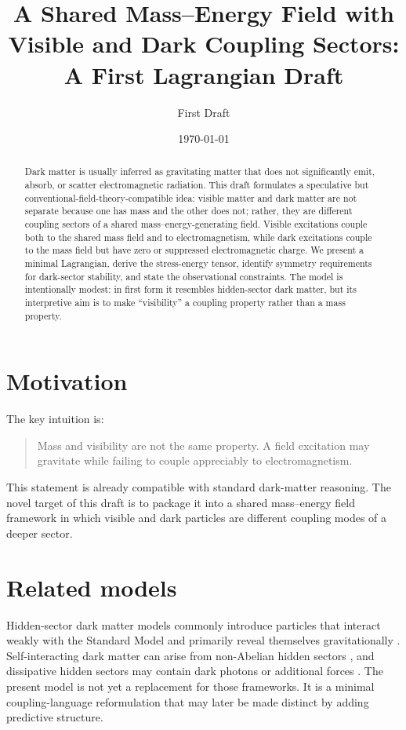 \documentclass[11pt]{article}
\title{A Shared Mass--Energy Field with Visible and Dark Coupling Sectors:\\A First Lagrangian Draft}
\author{First Draft}
\date{\today}
\theoremstyle{remark}
\begin{document}
\maketitle

\begin{abstract}
Dark matter is usually inferred as gravitating matter that does not significantly emit, absorb, or scatter electromagnetic radiation. This draft formulates a speculative but conventional-field-theory-compatible idea: visible matter and dark matter are not separate because one has mass and the other does not; rather, they are different coupling sectors of a shared mass--energy-generating field. Visible excitations couple both to the shared mass field and to electromagnetism, while dark excitations couple to the mass field but have zero or suppressed electromagnetic charge. We present a minimal Lagrangian, derive the stress-energy tensor, identify symmetry requirements for dark-sector stability, and state the observational constraints. The model is intentionally modest: in first form it resembles hidden-sector dark matter, but its interpretive aim is to make ``visibility'' a coupling property rather than a mass property.
\end{abstract}

\section{Motivation}
The key intuition is:
\begin{quote}
Mass and visibility are not the same property. A field excitation may gravitate while failing to couple appreciably to electromagnetism.
\end{quote}
This statement is already compatible with standard dark-matter reasoning. The novel target of this draft is to package it into a shared mass--energy field framework in which visible and dark particles are different coupling modes of a deeper sector.

\section{Related models}
Hidden-sector dark matter models commonly introduce particles that interact weakly with the Standard Model and primarily reveal themselves gravitationally \cite{Cheung2010}. Self-interacting dark matter can arise from non-Abelian hidden sectors \cite{Boddy2014}, and dissipative hidden sectors may contain dark photons or additional forces \cite{Foot2014}. The present model is not yet a replacement for those frameworks. It is a minimal coupling-language reformulation that may later be made distinct by adding predictive structure.
\end{document}
